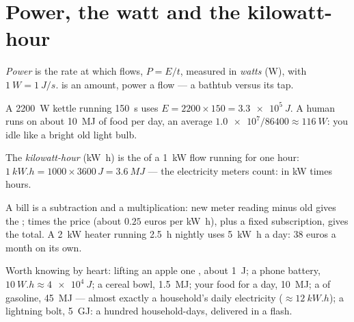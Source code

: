 \section{Power, the watt and the kilowatt-hour}

\begin{definition}[Power]\label{def:g10:energy-conservation:power}
\emph{Power} is the rate at which  flows,
$P = E/t$, measured in \emph{watts} (\unit{W}), with
$\qty{1}{W} = \qty{1}{J/s}$.  is an amount, power a flow ---
a bathtub versus its tap.
\end{definition}

\begin{example}\label{ex:g10:energy-conservation:power}
A \qty{2200}{W} kettle running \qty{150}{s} uses
$E = 2200 \times 150 = \qty{3.3e5}{J}$. A human runs on about
\qty{10}{MJ} of food per day, an average
$\num{1.0e7}/\num{86400} \approx \qty{116}{W}$: you idle like a
bright old light bulb.
\end{example}

\begin{definition}\label{def:g10:energy-conservation:kwh}
The \emph{kilowatt-hour} (\unit{kW.h}) is the
 of a \qty{1}{kW} flow running for one hour:
$\qty{1}{kW.h} = 1000 \times 3600\,\unit{J} = \qty{3.6}{MJ}$ ---
the  electricity meters count:  in \unit{kW} times hours.
\end{definition}

\begin{example}\label{ex:g10:energy-conservation:bill}
A bill is a subtraction and a multiplication: new meter reading
minus old gives the ; times the  price (about
$0.25$ euros per \unit{kW.h}), plus a fixed subscription, gives the
total. A \qty{2}{kW} heater running \qty{2.5}{h} nightly uses
\qty{5}{kW.h} a day: $38$ euros a month on its own.
\end{example}

\begin{example}\label{ex:g10:energy-conservation:orders}
Worth knowing by heart: lifting an apple one , about \qty{1}{J};
a phone battery, $\qty{10}{W.h} \approx \qty{4e4}{J}$; a cereal
bowl, \qty{1.5}{MJ}; your food for a day, \qty{10}{MJ}; a 
of gasoline, \qty{45}{MJ} --- almost exactly a household's daily
electricity ($\approx \qty{12}{kW.h}$); a lightning bolt, \qty{5}{GJ}:
a hundred household-days, delivered in a flash.
\end{example}

